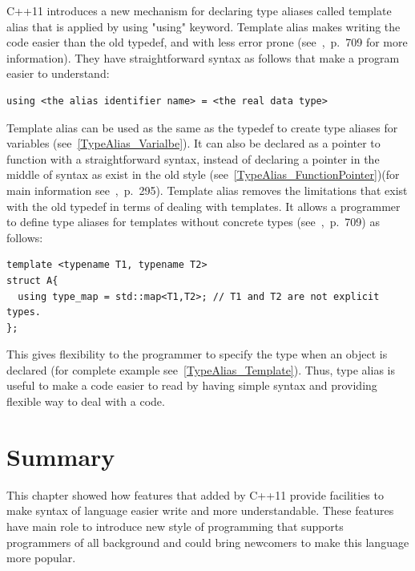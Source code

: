 \documentclass[11pt]{report}
\begin{document}
C++11 introduces a new mechanism for declaring type aliases called template alias that is applied by using "using" keyword. Template alias makes writing the code easier than the old typedef, and with less error prone \linebreak (see~\cite{Gregorie:professionalcpp},~p.~709 for more information). They have straightforward syntax as follows that make a program easier to understand:
\begin{lstlisting}
using <the alias identifier name> = <the real data type>
\end{lstlisting}
Template alias can be used as the same as the typedef to create type aliases for variables (see~\ref{TypeAlias_Varialbe}). It can also be declared as a pointer to function with a straightforward syntax, instead of declaring a pointer in the middle of syntax as exist in the old style (see~\ref{TypeAlias_FunctionPointer})(for main information see~\cite{Gregorie:professionalcpp},~p.~295). Template alias removes the limitations that exist with the old typedef in terms of dealing with templates. It allows a programmer to define type aliases for templates without concrete types (see~\cite{Gregorie:professionalcpp},~p.~709) as follows:
\begin{lstlisting}
template <typename T1, typename T2>
struct A{
  using type_map = std::map<T1,T2>; // T1 and T2 are not explicit types.
};
\end{lstlisting}
This gives flexibility to the programmer to specify the type when an object is declared (for complete example see~\ref{TypeAlias_Template}). Thus, type alias is useful to make a code easier to read by having simple syntax and providing flexible way to deal with a code.

\section{Summary}
\label{sect: Summary}
This chapter showed how features that added by C++11 provide facilities to make syntax of language easier write and more understandable. These features have main role to introduce new style of programming that supports programmers of all background and could bring newcomers to make this language more popular.

\end{document}
